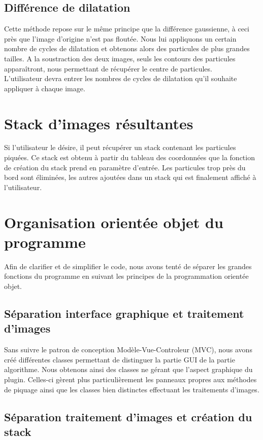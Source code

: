 \subsection{Différence de dilatation}

Cette méthode repose sur le même principe que la différence gaussienne, à ceci près que l'image d'origine n'est pas floutée. Nous lui appliquons un certain nombre de cycles de dilatation et obtenons alors des particules de plus grandes tailles. A la soustraction des deux images, seuls les contours des particules apparaîtront, nous permettant de récupérer le centre de particules.\\
L'utilisateur devra entrer les nombres de cycles de dilatation qu'il souhaite appliquer à chaque image.

\section{Stack d'images résultantes}

Si l'utilisateur le désire, il peut récupérer un stack contenant les particules piquées. Ce stack est obtenu à partir du tableau des coordonnées que la fonction de création du stack prend en paramètre d'entrée.
Les particules trop près du bord sont éliminées, les autres ajoutées dans un stack qui est finalement affiché à l'utilisateur.

\section{Organisation orientée objet du programme}

Afin de clarifier et de simplifier le code, nous avons tenté de séparer les grandes fonctions du programme en suivant les principes de la programmation orientée objet.

\subsection{Séparation interface graphique et traitement d'images}

Sans suivre le patron de conception Modèle-Vue-Controleur (MVC), nous avons créé différentes classes permettant de distinguer la partie GUI de la partie algorithme. Nous obtenons ainsi des classes ne gérant que l'aspect graphique du plugin. Celles-ci gèrent plus particulièrement les panneaux propres aux méthodes de piquage ainsi que les classes bien distinctes effectuant les traitements d'images.

\subsection{Séparation traitement d'images et création du stack}

